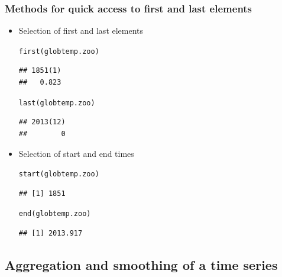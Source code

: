 \documentclass[xcolor=table, xcolor=dvipsnames]{beamer}\usepackage[]{graphicx}\usepackage[]{color}
\makeatletter
\newcommand{\hlstd}[1]{\textcolor[rgb]{0,0,0}{#1}}
\newcommand{\hlkwd}[1]{\textcolor[rgb]{0,0,1}{#1}}
\newenvironment{kframe}{%
 \def\at@end@of@kframe{}%
 \ifinner\ifhmode%
  \def\at@end@of@kframe{\end{minipage}}%
  \begin{minipage}{\columnwidth}%
 \fi\fi%
 \def\FrameCommand##1{\hskip\@totalleftmargin \hskip-\fboxsep
 \colorbox{shadecolor}{##1}\hskip-\fboxsep
     \hskip-\linewidth \hskip-\@totalleftmargin \hskip\columnwidth}%
 \MakeFramed {\advance\hsize-\width
   \@totalleftmargin\z@ \linewidth\hsize
   \@setminipage}}%
 {\par\unskip\endMakeFramed%
 \at@end@of@kframe}
\newenvironment{knitrout}{}{} %
\makeatother
\begin{document}

\begin{frame}[fragile]\frametitle{Methods for quick access to first and last elements}

\begin{itemize}
\item Selection of first and last elements
\begin{knitrout}
\color{fgcolor}\begin{kframe}
\begin{alltt}
\hlkwd{first}\hlstd{(globtemp.zoo)}
\end{alltt}
\begin{verbatim}
## 1851(1) 
##   0.823
\end{verbatim}
\begin{alltt}
\hlkwd{last}\hlstd{(globtemp.zoo)}
\end{alltt}
\begin{verbatim}
## 2013(12) 
##        0
\end{verbatim}
\end{kframe}
\end{knitrout}
\item Selection of start and end times
\begin{knitrout}
\color{fgcolor}\begin{kframe}
\begin{alltt}
\hlkwd{start}\hlstd{(globtemp.zoo)}
\end{alltt}
\begin{verbatim}
## [1] 1851
\end{verbatim}
\begin{alltt}
\hlkwd{end}\hlstd{(globtemp.zoo)}
\end{alltt}
\begin{verbatim}
## [1] 2013.917
\end{verbatim}
\end{kframe}
\end{knitrout}
\end{itemize}
\end{frame}

\subsection{Aggregation and smoothing of a time series}
\end{document}

